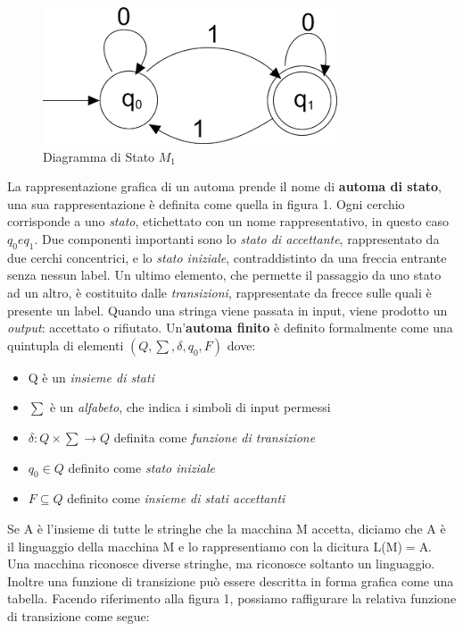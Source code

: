 \documentclass[a4paper]{extarticle}
\begin{document}
\begin{figure}[h]
\centering
\includegraphics[scale=0.8]{Automi - Diagramma di stato}
\caption{Diagramma di Stato $M_1$}
\label{fig:1}
\end{figure}
La rappresentazione grafica di un automa prende il nome di \textbf{automa di stato}, una sua rappresentazione è definita come quella in figura 1. Ogni cerchio corrisponde a uno \textit{stato}, etichettato con un nome rappresentativo, in questo caso $q_0 e q_1$. Due componenti importanti sono lo \textit{stato di accettante}, rappresentato da due cerchi concentrici, e lo \textit{stato iniziale}, contraddistinto da una freccia entrante senza nessun label. Un ultimo elemento, che permette il passaggio da uno stato ad un altro, è costituito dalle \textit{transizioni}, rappresentate da frecce sulle quali è presente un label. Quando una stringa viene passata in input, viene prodotto un \textit{output}: accettato o rifiutato.
Un'\textbf{automa finito} è definito formalmente come una quintupla di elementi $(Q,\sum,\delta,q_0,F)$ dove:
\begin{itemize}
\item Q è un \textit{insieme di stati}
\item $\sum$ è un \textit{alfabeto}, che indica i simboli di input permessi
\item $\delta : Q \times \sum \rightarrow Q$ definita come \textit{funzione di transizione}
\item $q_0 \in Q$ definito come \textit{stato iniziale}
\item $F \subseteq Q$ definito come \textit{insieme di stati accettanti}
\end{itemize}

Se A è l'insieme di tutte le stringhe che la macchina M accetta, diciamo che A è il linguaggio della macchina M e lo rappresentiamo con la dicitura L(M)$=$A. Una macchina riconosce diverse stringhe, ma riconosce soltanto un linguaggio. Inoltre una funzione di transizione può essere descritta in forma grafica come una tabella. Facendo riferimento alla figura 1, possiamo raffigurare la relativa funzione di transizione come segue:
\end{document}
